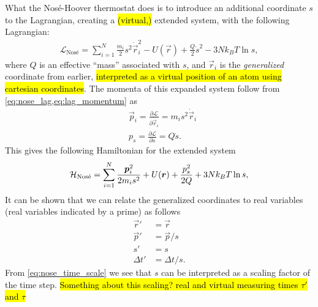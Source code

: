 What the Nosé-Hoover thermostat does is to introduce an additional coordinate $s$ to the Lagrangian, creating a \hl{(virtual,)} extended system, with the following Lagrangian\cite{nose1984unified}:
\begin{align}
    \mathcal{L}_\text{Nos\'e} = \sum_{i=1}^N \frac{m_i}{2}s^2 \dot{\vec r}_i^2 - U(\vec r) + \frac{Q}{2}\dot s^2 - 3Nk_BT \ln s,
    \label{eq:nose_lag}
\end{align}
where $Q$ is an effective ``mass'' associated with $s$, and $\vec r_i$ is the \emph{generalized} coordinate from earlier, \hl{interpreted as a virtual position of an atom using cartesian coordinates}. The momenta of this expanded system follow from \cref{eq:nose_lag,eq:lag_momentum} as
\begin{align*}
    &\vec p_i = \frac{\partial \mathcal{L}}{\partial \dot{\vec r}_i} = m_i s^2 \dot{\vec r}_i \\
    &p_s = \frac{\partial \mathcal{L}}{\partial \dot s} = Q\dot s.
\end{align*}
This gives the following Hamiltonian for the extended system
\begin{align}
    \operatorname{\mathcal{H}}_\text{Nos\'e} = \sum_{i=1}^N \frac{\boldsymbol{p}_i^2}{2m_is^2} + U(\boldsymbol{r}) + \frac{p_s^2}{2Q} + 3Nk_BT \ln s,
    \label{eq:nose_hamiltonian}
\end{align}
It can be shown that we can relate the generalized coordinates to real variables (real variables indicated by a prime) as follows
\begin{align}
    \vec r' &= \vec r \nonumber\\
    \vec p' &= \vec p/s \nonumber\\
    s' &= s \nonumber\\
    \Delta t' &= \Delta t/s. \label{eq:nose_time_scale}
\end{align}
From \cref{eq:nose_time_scale} we see that $s$ can be interpreted as a scaling factor of the time step. \hl{Something about this scaling? real and virtual measuring times $\tau'$ and $\tau$}

